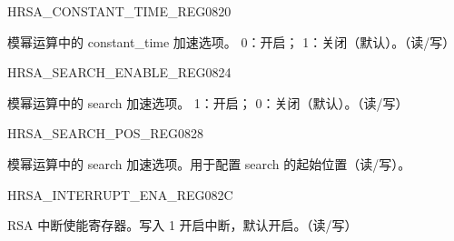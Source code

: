 \begin{register}{H}{RSA\_CONSTANT\_TIME\_REG}{\hexprefix{}0820}\label{regdesc:RSACONSTANTTIMEREG}
%
%
\regnewline%
\begin{regdesc}\begin{reglist}
\item [RSA\_CONSTANT\_TIME\_REG] 模幂运算中的 constant\_time 加速选项。
0：开启；
1：关闭（默认）。（读/写）
\end{reglist}\end{regdesc}
\end{register}


\begin{register}{H}{RSA\_SEARCH\_ENABLE\_REG}{\hexprefix{}0824}\label{regdesc:RSASEARCHENABLEREG}
%
%
\regnewline%
\begin{regdesc}\begin{reglist}
\item [RSA\_SEARCH\_ENABLE] 模幂运算中的 search 加速选项。
1：开启；
0：关闭（默认）。（读/写）
\end{reglist}\end{regdesc}
\end{register}



\begin{register}{H}{RSA\_SEARCH\_POS\_REG}{\hexprefix{}0828}\label{regdesc:RSASEARCHPOSREG}
%
%
\regnewline%
\begin{regdesc}\begin{reglist}
\item [RSA\_SEARCH\_POS] 模幂运算中的 search 加速选项。用于配置 search 的起始位置（读/写）。
\end{reglist}\end{regdesc}
\end{register}


\begin{register}{H}{RSA\_INTERRUPT\_ENA\_REG}{\hexprefix{}082C}\label{regdesc:RSAINTERRUPTENAREG}
%
%
\regnewline%
\begin{regdesc}\begin{reglist}
\item [RSA\_INTERRUPT\_ENA] RSA 中断使能寄存器。写入 1 开启中断，默认开启。（读/写）
\end{reglist}\end{regdesc}
\end{register}


